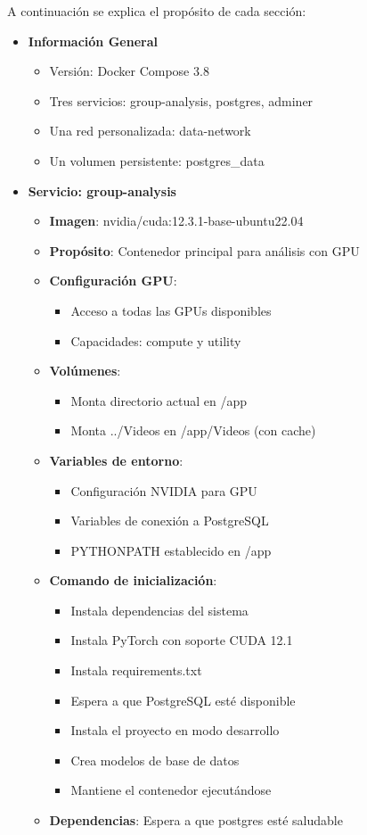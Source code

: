 A continuación se explica el propósito de cada sección:
\begin{itemize}
	\item \textbf{Información General}
	\begin{itemize}
		\item Versión: Docker Compose 3.8
		\item Tres servicios: group-analysis, postgres, adminer
		\item Una red personalizada: data-network
		\item Un volumen persistente: postgres\_data
	\end{itemize}
	
	\item \textbf{Servicio: group-analysis}
	\begin{itemize}
		\item \textbf{Imagen}: nvidia/cuda:12.3.1-base-ubuntu22.04
		\item \textbf{Propósito}: Contenedor principal para análisis con GPU
		\item \textbf{Configuración GPU}:
		\begin{itemize}
			\item Acceso a todas las GPUs disponibles
			\item Capacidades: compute y utility
		\end{itemize}
		\item \textbf{Volúmenes}:
		\begin{itemize}
			\item Monta directorio actual en /app
			\item Monta ../Videos en /app/Videos (con cache)
		\end{itemize}
		\item \textbf{Variables de entorno}:
		\begin{itemize}
			\item Configuración NVIDIA para GPU
			\item Variables de conexión a PostgreSQL
			\item PYTHONPATH establecido en /app
		\end{itemize}
		\item \textbf{Comando de inicialización}:
		\begin{itemize}
			\item Instala dependencias del sistema
			\item Instala PyTorch con soporte CUDA 12.1
			\item Instala requirements.txt
			\item Espera a que PostgreSQL esté disponible
			\item Instala el proyecto en modo desarrollo
			\item Crea modelos de base de datos
			\item Mantiene el contenedor ejecutándose
		\end{itemize}
		\item \textbf{Dependencias}: Espera a que postgres esté saludable
	\end{itemize}
	

\end{itemize}
